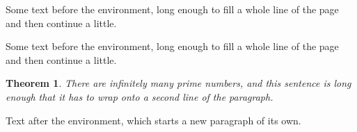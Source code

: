 \documentclass{article}
\newtheorem{theorem}{Theorem}
\begin{document}
Some text before the environment, long enough to fill a whole line of the page and then continue a little.

Some text before the environment, long enough to fill a whole line of the page and then continue a little.
\begin{theorem}
There are infinitely many prime numbers, and this sentence is long enough that it has to wrap onto a second line of the paragraph.
\end{theorem}

Text after the environment, which starts a new paragraph of its own.
\end{document}
